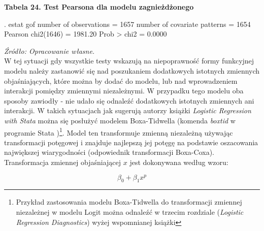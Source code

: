 \vspace{0.5cm}

\textbf{Tabela 24. Test Pearsona dla modelu zagnieżdżonego}

\begin{stlog}

. estat gof 
{\smallskip}
{}
{\smallskip}
       number of observations =      1657
 number of covariate patterns =      1654
           Pearson chi2(1646) =      1981.20
                  Prob > chi2 =         0.0000

\end{stlog}

\textit{\footnotesize{Źródło: Opracowanie własne.}} \\


W tej sytuacji gdy wszystkie testy wskazują na niepoprawność formy funkcyjnej modelu należy zastanowić się nad poszukaniem dodatkowych istotnych zmiennych objaśniających, które można by dodać do modelu, lub nad wprowadzeniem interakcji pomiędzy zmiennymi niezależnymi. W przypadku tego modelu oba sposoby zawiodły - nie udało się odnaleźć dodatkowych istotnych zmiennych ani interakcji. W takich sytuacjach jak sugerują autorzy książki \textit{Logistic Regression with Stata} \cite{chen10} można się posłużyć modelem Boxa-Tidwella (komenda \textit{boxtid} w programie Stata )\footnote{ Przykład zastosowania modelu Boxa-Tidwella do transformacji zmiennej niezależnej w modelu Logit można odnaleźć w trzecim rozdziale (\textit{Logistic Regression Diagnostics}) wyżej wspomnianej książki}. Model ten transformuje zmienną niezależną używając transformacji potęgowej i znajduje najlepszą jej potęgę na podstawie oszacowania największej wiarygodności (odpowiednik transformacji Boxa-Coxa). Transformacja zmiennej objaśniającej $x$ jest dokonywana według wzoru:


\begin{equation}
	\beta_0+\beta_1x^p
\end{equation}
\vspace{0.4cm}

